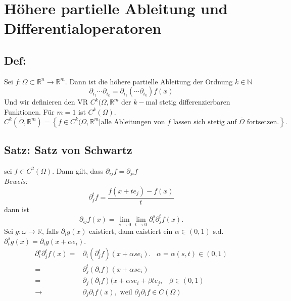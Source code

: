 \section{Höhere partielle Ableitung und Differentialoperatoren}

\subsection{Def: }
Sei $f:\Omega\subset\mathbb R^n \rightarrow \mathbb R^m$. Dann ist die höhere partielle Ableitung der Ordnung $k\in\mathbb N$
$$
\partial_{i_1}\cdots\partial_{i_k} = \partial_{i_1}\left(\cdots\partial_{i_k}\right)f(x)
$$
Und wir definieren den VR $C^k(\Omega,\mathbb R^m$ der $k-$mal stetig differenzierbaren Funktionen. Für $m=1$ ist $C^k(\Omega)$.\\
$C^k(\bar\Omega,\mathbb R^m) = \left\{f\in C^k(\Omega,\mathbb R^m | \text{alle Ableitungen von $f$ lassen sich stetig auf $\bar\Omega$ fortsetzen.}\right\}.$

\subsection{Satz: Satz von Schwartz}
sei $f\in C^2(\Omega)$. Dann gilt, dass $\partial_{ij} f = \partial_{ji} f$\\
\textit{Beweis: }
$$
\partial_j^t f = \frac{f(x+te_j) - f(x)}{t}
$$
dann ist
$$
\partial_{ij}f(x) = \lim_{s\rightarrow 0}\lim_{t\rightarrow 0}\partial_i^s \partial_j^t f(x).
$$
Sei $g:\omega\rightarrow\mathbb R$, falls $\partial_i g(x)$ existiert, dann existiert ein $\alpha\in(0,1)$ s.d. $\partial_i^s g(x) = \partial_i g(x+\alpha e_i)$.
\begin{align}
	\partial_i^s \partial_j^t f(x) =& \partial_i (\partial_j^t f)(x+\alpha s e_i).\;\;\; \alpha = \alpha(s,t) \in (0,1)\\
=& \partial_j^t (\partial_ i f)(x+ \alpha s e_i)\\
=& \partial_j(\partial_i f) (x + \alpha se_i + \beta t e_j, \;\;\; \beta\in(0,1)\\
\rightarrow& \partial_j\partial_i f(x), \text{ weil $\partial_j\partial_i f\in C(\Omega)$}
\end{align}

